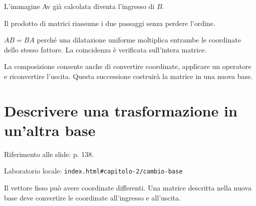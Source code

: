 L'immagine Av già calcolata diventa l'ingresso di \(B\).\par


\label{c2-composizione-example-2-step-6}


Il prodotto di matrici riassume i due passaggi senza perdere l'ordine.\par



\(AB=BA\) perché una dilatazione uniforme moltiplica entrambe le coordinate dello stesso fattore. La coincidenza è verificata sull'intera matrice.\par


La composizione consente anche di convertire coordinate, applicare un operatore e riconvertire l'uscita. Questa successione costruirà la matrice in una nuova base.\par



\Needspace{.43\textheight}
\section{Descrivere una trasformazione in un'altra base}
\label{c2-cambio-base}

{\sffamily\small\color{Ink!70} Riferimento alle slide: p. 138.\par}

{\sffamily\small\color{Ink!70} Laboratorio locale: \nolinkurl{index.html#capitolo-2/cambio-base}\par}

Il vettore fisso può avere coordinate differenti. Una matrice descritta nella nuova base deve convertire le coordinate all'ingresso e all'uscita.\par

